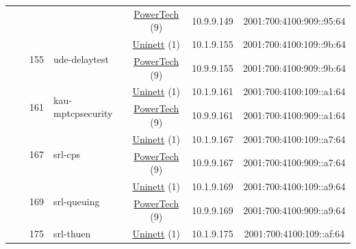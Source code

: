 \begin{small}
\begin{center}
\begin{longtable}{|c|c|c|c|c|c|c|c|}
  &  &  &  & \multicolumn{2}{|c|}{\tiny{\href{http://www.powertech.no}{PowerTech} (9)}} & \tiny{10.9.9.149} & \tiny{2001:700:4100:909::95:64} \\* \cline{3-3}\cline{4-4}\cline{5-5}\cline{6-6}\cline{7-7}\cline{8-8}
  &  & \multirow{2}{*}{\tiny{155}} & \multicolumn{1}{|l|}{\multirow{2}{*}{\tiny{ude-delaytest}}} & \multicolumn{2}{|c|}{\tiny{\href{https://www.uninett.no}{Uninett} (1)}} & \tiny{10.1.9.155} & \tiny{2001:700:4100:109::9b:64} \\* \cline{5-5}\cline{6-6}\cline{7-7}\cline{8-8}
  &  &  &  & \multicolumn{2}{|c|}{\tiny{\href{http://www.powertech.no}{PowerTech} (9)}} & \tiny{10.9.9.155} & \tiny{2001:700:4100:909::9b:64} \\* \cline{3-3}\cline{4-4}\cline{5-5}\cline{6-6}\cline{7-7}\cline{8-8}
  &  & \multirow{2}{*}{\tiny{161}} & \multicolumn{1}{|l|}{\multirow{2}{*}{\tiny{kau-mptcpsecurity}}} & \multicolumn{2}{|c|}{\tiny{\href{https://www.uninett.no}{Uninett} (1)}} & \tiny{10.1.9.161} & \tiny{2001:700:4100:109::a1:64} \\* \cline{5-5}\cline{6-6}\cline{7-7}\cline{8-8}
  &  &  &  & \multicolumn{2}{|c|}{\tiny{\href{http://www.powertech.no}{PowerTech} (9)}} & \tiny{10.9.9.161} & \tiny{2001:700:4100:909::a1:64} \\* \cline{3-3}\cline{4-4}\cline{5-5}\cline{6-6}\cline{7-7}\cline{8-8}
  &  & \multirow{2}{*}{\tiny{167}} & \multicolumn{1}{|l|}{\multirow{2}{*}{\tiny{srl-cps}}} & \multicolumn{2}{|c|}{\tiny{\href{https://www.uninett.no}{Uninett} (1)}} & \tiny{10.1.9.167} & \tiny{2001:700:4100:109::a7:64} \\* \cline{5-5}\cline{6-6}\cline{7-7}\cline{8-8}
  &  &  &  & \multicolumn{2}{|c|}{\tiny{\href{http://www.powertech.no}{PowerTech} (9)}} & \tiny{10.9.9.167} & \tiny{2001:700:4100:909::a7:64} \\* \cline{3-3}\cline{4-4}\cline{5-5}\cline{6-6}\cline{7-7}\cline{8-8}
  &  & \multirow{2}{*}{\tiny{169}} & \multicolumn{1}{|l|}{\multirow{2}{*}{\tiny{srl-queuing}}} & \multicolumn{2}{|c|}{\tiny{\href{https://www.uninett.no}{Uninett} (1)}} & \tiny{10.1.9.169} & \tiny{2001:700:4100:109::a9:64} \\* \cline{5-5}\cline{6-6}\cline{7-7}\cline{8-8}
  &  &  &  & \multicolumn{2}{|c|}{\tiny{\href{http://www.powertech.no}{PowerTech} (9)}} & \tiny{10.9.9.169} & \tiny{2001:700:4100:909::a9:64} \\* \cline{3-3}\cline{4-4}\cline{5-5}\cline{6-6}\cline{7-7}\cline{8-8}
  &  & \multirow{2}{*}{\tiny{175}} & \multicolumn{1}{|l|}{\multirow{2}{*}{\tiny{srl-thuen}}} & \multicolumn{2}{|c|}{\tiny{\href{https://www.uninett.no}{Uninett} (1)}} & \tiny{10.1.9.175} & \tiny{2001:700:4100:109::af:64} \\* \cline{5-5}\cline{6-6}\cline{7-7}\cline{8-8}

\end{longtable}
\end{center}
\end{small}
